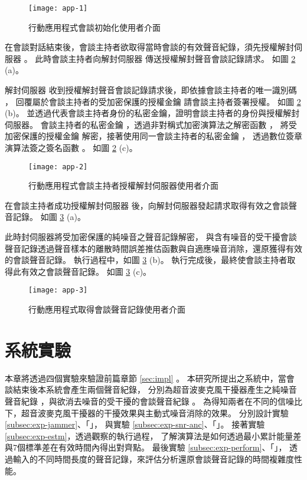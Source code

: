 \begin{figure}[H]
    \centering
    \texttt{[image: app-1]}
    \caption{行動應用程式會談初始化使用者介面}\label{fig:app-1}
\end{figure}

    在會談對話結束後，會談主持者欲取得當時會談的有效聲音紀錄，須先授權解封伺服器 \DEFserver。
此時會談主持者向解封伺服器 \DEFserver 傳送授權解封聲音會談記錄請求。
如圖 \ref{fig:app-2}  (a)。

    解封伺服器 \DEFserver 收到授權解封聲音會談記錄請求後，即依據會談主持者的唯一識別碼 \DEFownerID，
回覆屬於會談主持者的受加密保護的授權金鑰 \DEFakEnc 請會談主持者簽署授權。
如圖 \ref{fig:app-2}  (b)。
並透過代表會談主持者身份的私密金鑰，證明會談主持者的身份與授權解封伺服器。
會談主持者的私密金鑰 \DEFprivateKey，透過非對稱式加密演算法之解密函數 \DEFfuncDecSK{}，
將受加密保護的授權金鑰 \DEFakEnc 解密，接著使用同一會談主持者的私密金鑰 \DEFprivateKey，
透過數位簽章演算法簽之簽名函數 \DEFfuncSignSK{}。
如圖 \ref{fig:app-2}  (c)。

\begin{figure}[H]
    \centering
    \texttt{[image: app-2]}
    \caption{行動應用程式會談主持者授權解封伺服器使用者介面}\label{fig:app-2}
\end{figure}

    在會談主持者成功授權解封伺服器 \DEFserver 後，向解封伺服器發起請求取得有效之會談聲音記錄。
如圖 \ref{fig:app-3}  (a)。

    此時封伺服器將受加密保護的純噪音之聲音記錄解密，
與含有噪音的受干擾會談聲音記錄透過聲音樣本的離散時間誤差推估函數與自適應噪音消除，還原獲得有效的會談聲音記錄。
執行過程中，如圖 \ref{fig:app-3}  (b)。
執行完成後，最終使會談主持者取得此有效之會談聲音記錄。
如圖 \ref{fig:app-3}  (c)。

\begin{figure}[H]
    \centering
    \texttt{[image: app-3]}
    \caption{行動應用程式取得會談聲音記錄使用者介面}\label{fig:app-3}
\end{figure}


\section{系統實驗}\label{sec:exp}

    本章將透過四個實驗來驗證前篇章節 \ref{sec:impl} 。
本研究所提出之系統中，當會談結束後本系統會產生兩個聲音紀錄，
分別為超音波麥克風干擾器產生之純噪音聲音紀錄 \DEFrecN，與欲消去噪音的受干擾的會談聲音紀錄 \DEFrecJ。
為得知兩者在不同的信噪比下，超音波麥克風干擾器的干擾效果與主動式噪音消除的效果。
分別設計實驗 \ref{subsec:exp-jammer}、「」，
與實驗 \ref{subsec:exp-snr-anc}、「」。
接著實驗 \ref{subsec:exp-estm}，透過觀察的執行過程，
了解演算法是如何透過最小累計能量差與7個標準差在有效時間內得出對齊點。
最後實驗 \ref{subsec:exp-perform}、「」，
透過輸入的不同時間長度的聲音記錄，來評估分析還原會談聲音記錄的時間複雜度性能。


